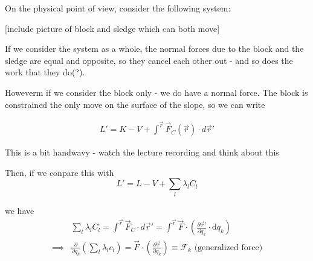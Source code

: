 \documentclass[11pt]{article}
\begin{document}
On the physical point of view, consider the following system:

\vskip 0.5cm
[include picture of block and sledge which can both move]
\vskip 0.5cm

If we consider the system as a whole, the normal forces due to the block and the sledge are equal and opposite, so they cancel each other out - and so does the work that they do(?).

\vskip 0.5cm
Howeverm if we consider the block only - we do have a normal force. The block is constrained the only move on the surface of the slope, so we can write 

\begin{align*}
  L' = K - V + \int^{\vec{r}} \vec{F}_C(\vec{r}) \cdot d\vec{r}'
\end{align*}

\begin{thought}
  {This is a bit handwavy - watch the lecture recording and think about this}
\end{thought}

Then, if we conpare this with 
\[ L' = L - V + \sum_{l} \lambda_l C_l \]

we have 
\begin{align*}
  &\sum_{l} \lambda_l C_l = \int^{\vec{r}} \vec{F}_C \cdot d\vec{r}' = \int^{\vec{r}} \vec{F} \cdot \left( \frac{\partial \vec{r}'}{\partial q_k} \cdot \mathrm{d}q_k \right) \\
  \implies& \frac{\partial}{\partial q_k} \left( \sum_{l} \lambda_l c_l \right) = \vec{F} \cdot \left( \frac{\partial \vec{r}}{\partial q_{k}} \right) \equiv \mathcal{F}_k \text{  (generalized force)}
\end{align*}

    

    



\end{document}
